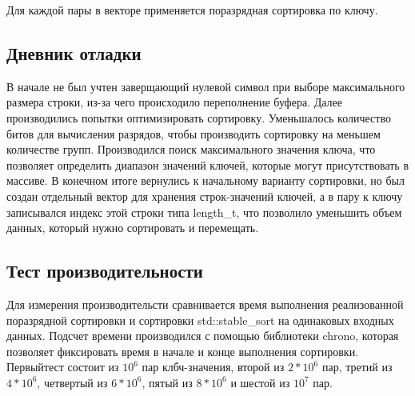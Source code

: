 \documentclass[12pt]{article}
\begin{document}
Для каждой пары в векторе применяется поразрядная сортировка по ключу.

\subsection*{Дневник отладки}

В начале не был учтен заверщающий нулевой символ при выборе максимального размера строки, из-за чего происходило переполнение буфера.\newline
Далее производились попытки оптимизировать сортировку. Уменьшалось количество битов для вычисления разрядов, чтобы производить сортировку на меньшем количестве групп. Производился поиск максимального значения ключа, что позволяет определить диапазон значений ключей, которые могут присутствовать в массиве.\newline
В конечном итоге вернулись к начальному варианту сортировки, но был создан отдельный вектор для хранения строк-значений ключей, а в пару к ключу записывался индекс этой строки типа length\_t, что позволило уменьшить объем данных, который нужно сортировать и перемещать.

\subsection*{Тест производительности}

Для измерения производительсти сравнивается время выполнения реализованной поразрядной сортировки и сортировки std::stable\_sort на одинаковых входных данных. Подсчет времени производился с помощью библиотеки chrono, которая позволяет фиксировать время в начале и конце выполнения сортировки. Первыйтест состоит из $10^6$ пар клбч-значения, второй из $2 * 10^6$ пар, третий из $4 *10^6$, четвертый из $6 * 10^6$, пятый из $8 * 10^6$ и шестой из $10^7$ пар.
\newline
\end{document}
